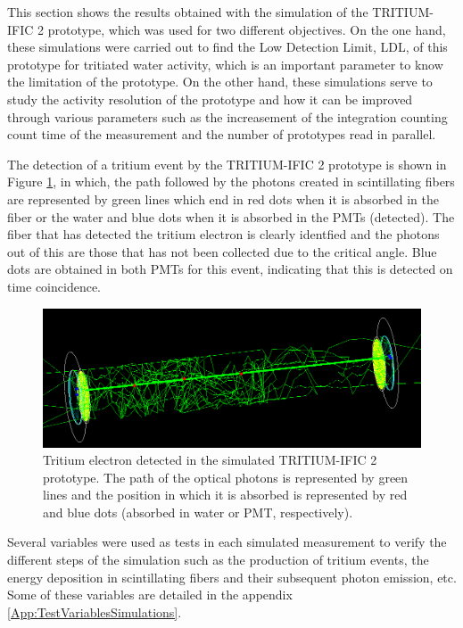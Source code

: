 This section shows the results obtained with the simulation of the TRITIUM-IFIC 2 prototype, which was used for two different objectives. On the one hand, these simulations were carried out to find the Low Detection Limit, LDL, of this prototype for tritiated water activity, which is an important parameter to know the limitation of the prototype. On the other hand, these simulations serve to study the activity resolution of the prototype and  how it can be improved through various parameters such as the increasement of the integration counting count time of the measurement and the number of prototypes read in parallel.

The detection of a tritium event by the TRITIUM-IFIC 2 prototype is shown in Figure \ref{fig:TritiumEventDetectedInSimulatedPrototype}, in which, the path followed by the photons created in scintillating fibers are represented by green lines which end in red dots when it is absorbed in the fiber or the water and blue dots when it is absorbed in the PMTs (detected). The fiber that has detected the tritium electron is clearly identfied and the photons out of this are those that has not been collected due to the critical angle. Blue dots are obtained in both PMTs for this event, indicating that this is detected on time coincidence.

\begin{figure}[hbtp]
\centering
\includegraphics[scale=0.35]{Figures/8SimulationsResults/82TRITIUMMonitor/821TRITIUMIFIC2/EventDetectedInTRITIUMIFIC2.png}
\caption{Tritium electron detected in the simulated TRITIUM-IFIC 2 prototype. The path of the optical photons is represented by green lines and the position in which it is absorbed is represented by red and blue dots (absorbed in water or PMT, respectively).\label{fig:TritiumEventDetectedInSimulatedPrototype}}
\end{figure}

Several variables were used as tests in each simulated measurement to verify the different steps of the simulation such as the production of tritium events, the energy deposition in scintillating fibers and their subsequent photon emission, etc. Some of these variables are detailed in the appendix \ref{App:TestVariablesSimulations}.

